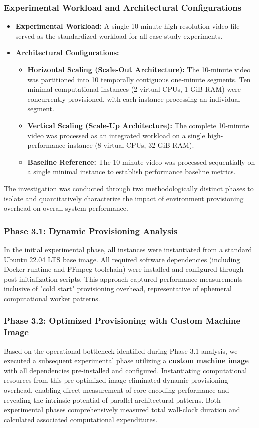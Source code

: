 \documentclass[conference]{IEEEtran}
\begin{document}
	\subsubsection{Experimental Workload and Architectural Configurations}
	\begin{itemize}
		\item \textbf{Experimental Workload:} A single 10-minute high-resolution video file served as the standardized workload for all case study experiments.
		\item \textbf{Architectural Configurations:}
		\begin{itemize}
			\item \textbf{Horizontal Scaling (Scale-Out Architecture):} The 10-minute video was partitioned into 10 temporally contiguous one-minute segments. Ten minimal computational instances (2 virtual CPUs, 1 GiB RAM) were concurrently provisioned, with each instance processing an individual segment.
			\item \textbf{Vertical Scaling (Scale-Up Architecture):} The complete 10-minute video was processed as an integrated workload on a single high-performance instance (8 virtual CPUs, 32 GiB RAM).
			\item \textbf{Baseline Reference:} The 10-minute video was processed sequentially on a single minimal instance to establish performance baseline metrics.
		\end{itemize}
	\end{itemize}
	
	The investigation was conducted through two methodologically distinct phases to isolate and quantitatively characterize the impact of environment provisioning overhead on overall system performance.
	
	\subsubsection{Phase 3.1: Dynamic Provisioning Analysis}
	In the initial experimental phase, all instances were instantiated from a standard Ubuntu 22.04 LTS base image. All required software dependencies (including Docker runtime and FFmpeg toolchain) were installed and configured through post-initialization scripts. This approach captured performance measurements inclusive of "cold start" provisioning overhead, representative of ephemeral computational worker patterns.
	
	\subsubsection{Phase 3.2: Optimized Provisioning with Custom Machine Image}
	Based on the operational bottleneck identified during Phase 3.1 analysis, we executed a subsequent experimental phase utilizing a \textbf{custom machine image} with all dependencies pre-installed and configured. Instantiating computational resources from this pre-optimized image eliminated dynamic provisioning overhead, enabling direct measurement of core encoding performance and revealing the intrinsic potential of parallel architectural patterns. Both experimental phases comprehensively measured total wall-clock duration and calculated associated computational expenditures.
	
\end{document}
